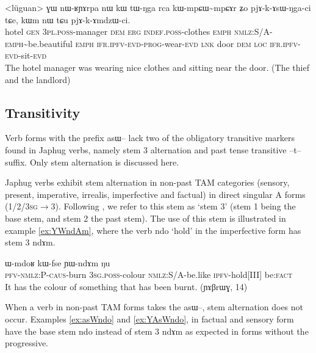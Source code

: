 \documentclass[oldfontcommands,oneside,a4paper,11pt]{article}
\newcommand{\ipa}[1]{{\phon \mbox{#1}}} %
\newcommand{\factual}[1]{\textsc{:fact}}
\begin{document}
\begin{exe}
\ex \label{ex:pjAkAsWNgaci}
\gll
<lüguan>	\ipa{ɣɯ} 	\ipa{nɯ-ʁɲɤrpa} 	\ipa{nɯ} 	\ipa{kɯ} 	\ipa{tɯ-ŋga} 	\ipa{rca} 	\ipa{kɯ-mpɕɯ\textasciitilde{}mpɕɤr} 	\ipa{ʑo} 	\ipa{pjɤ-k-ɤsɯ-ŋga-ci} 	\ipa{tɕe,} 	\ipa{kɯm} 	\ipa{nɯ} 	\ipa{tɕu} 	\ipa{pjɤ-k-ɤmdzɯ-ci.} 	\\
hotel \textsc{gen} \textsc{3pl.poss}-manager \textsc{dem} \textsc{erg} \textsc{indef.poss}-clothes \textsc{emph} \textsc{nmlz:S/A-emph}\textasciitilde{}be.beautiful \textsc{emph} \textsc{ifr.ipfv-evd-prog}-wear-\textsc{evd} \textsc{lnk} door \textsc{dem} \textsc{loc} \textsc{ifr.ipfv-evd}-sit-\textsc{evd}
\\
\glt The hotel manager was wearing nice clothes and sitting near the door. (The thief and the landlord)
\end{exe}

\subsection{Transitivity}

Verb forms with the prefix \ipa{asɯ--} lack two of the obligatory transitive markers found in Japhug verbs, namely stem 3 alternation and past tense transitive \ipa{--t--} suffix. Only stem alternation is discussed here.

Japhug verbs exhibit stem alternation in non-past TAM categories (sensory, present, imperative, irrealis, imperfective and factual) in direct singular A forms (\textsc{1/2/3sg}$\rightarrow$3). Following \citet{jackson00puxi}, we refer to this stem as `stem 3' (stem 1 being the base stem, and stem 2 the past stem). The use of this stem is illustrated in example \ref{ex:YWndAm}, where the verb \ipa{ndo} `hold' in the imperfective form has stem 3 \ipa{ndɤm}.

\begin{exe}
\ex \label{ex:YWndAm}
\gll \ipa{kɤ-kɤ-sɯ-ɕke} 	\ipa{ɯ-mdoʁ} 	\ipa{kɯ-fse} 	\ipa{ɲɯ-ndɤm} 		\ipa{ŋu} \\
\textsc{pfv-nmlz:P-caus}-burn \textsc{3sg.poss}-colour \textsc{nmlz:S/A}-be.like \textsc{ipfv}-hold[III] be\factual{} \\
\glt  It has the colour of something that has been burnt. (\ipa{ɲɤβrɯɣ}, 14)
\end{exe}

When a verb in non-past TAM forms takes the \ipa{asɯ--}, stem alternation does not occur. Examples \ref{ex:asWndo} and \ref{ex:YAsWndo}, in factual and sensory form have the base stem \ipa{ndo} instead of stem 3 \ipa{ndɤm} as expected in forms without the progressive.
\end{document}
